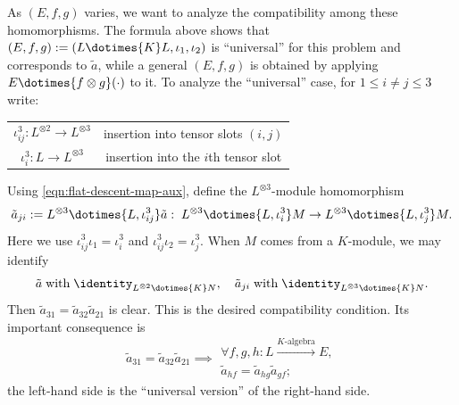 As $(E,f,g)$ varies, we want to analyze the compatibility among these
homomorphisms. The formula above shows that
$(E,f,g):=(L\dotimes{K}L,\iota_1,\iota_2)$ is ``universal'' for this problem
and corresponds to $\tilde a$, while a general $(E,f,g)$ is obtained by
applying $E\dotimes{f\otimes g}(\mathord\cdot)$ to it. To analyze the
``universal'' case, for $1\leq i\neq j\leq3$ write:
\begin{center}\begin{tabular}{|c|c|} \hline
		$\iota^3_{ij}: L^{\otimes 2} \to L^{\otimes 3}$ & insertion into tensor slots $(i,j)$ \\
		$\iota^3_i: L \to L^{\otimes 3}$ & insertion into the $i$th tensor slot \\ \hline
\end{tabular}\end{center}

Using \eqref{eqn:flat-descent-map-aux}, define the $L^{\otimes3}$-module
homomorphism
\[ \tilde{a}_{ji} := L^{\otimes 3} \dotimes{L, \iota^3_{ij}}\tilde{a} : \; L^{\otimes 3} \dotimes{L, \iota^3_i} M \to L^{\otimes 3} \dotimes{L, \iota^3_j} M. \]
Here we use $\iota^3_{ij}\iota_1=\iota^3_i$ and
$\iota^3_{ij}\iota_2=\iota^3_j$. When $M$ comes from a $K$-module, we may
identify
\[ \tilde{a} \;\text{with}\; \identity_{L^{\otimes 2} \dotimes{K} N}, \quad \tilde{a}_{ji} \;\text{with}\; \identity_{L^{\otimes 3} \dotimes{K} N}. \]
Then $\tilde a_{31}=\tilde a_{32}\tilde a_{21}$ is clear. This is the desired
compatibility condition. Its important consequence is
\begin{equation}\label{eqn:cocycle-condition-descent}
	\tilde{a}_{31} = \tilde{a}_{32} \tilde{a}_{21} \implies
	\begin{array}{l}
		\forall f, g, h: L \xrightarrow{K\text{-algebra}} E, \\
		\tilde{a}_{hf} = \tilde{a}_{hg} \tilde{a}_{gf};
	\end{array}
\end{equation}
the left-hand side is the ``universal version'' of the right-hand side.

